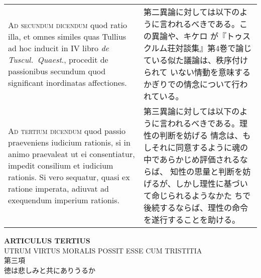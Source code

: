 \documentclass[10pt]{jsarticle}
\begin{document}
\begin{longtable}{p{21em}p{21em}}
\\

{\scshape Ad secundum dicendum} quod ratio illa, et omnes similes quas
Tullius ad hoc inducit in IV libro {\itshape de Tuscul.~Quaest}., procedit de
passionibus secundum quod significant inordinatas affectiones.

&

 第二異論に対しては以下のように言われるべきである。この異論や、キケロ
 が『トゥスクルム荘対談集』第4巻で論じている似た議論は、秩序付けられて
 いない情動を意味するかぎりでの情念について行われている。
 
\\

{\scshape Ad tertium dicendum} quod passio praeveniens iudicium
rationis, si in animo praevaleat ut ei consentiatur, impedit consilium
et iudicium rationis. Si vero sequatur, quasi ex ratione imperata,
adiuvat ad exequendum imperium rationis.

&

 第三異論に対しては以下のように言われるべきである。理性の判断を妨げる
 情念は、もしそれに同意するように魂の中であらかじめ評価されるならば、
 知性の思量と判断を妨げるが、しかし理性に基づいて命じられるようなかた
 ちで後続するならば、理性の命令を遂行することを助ける。

\end{longtable}
\newpage






\begin{center}
{\Large {\bf ARTICULUS TERTIUS}}\\
{\large UTRUM VIRTUS MORALIS POSSIT ESSE CUM TRISTITIA}\\
{\Large 第三項\\徳は悲しみと共にありうるか}
\end{center}
\end{document}
